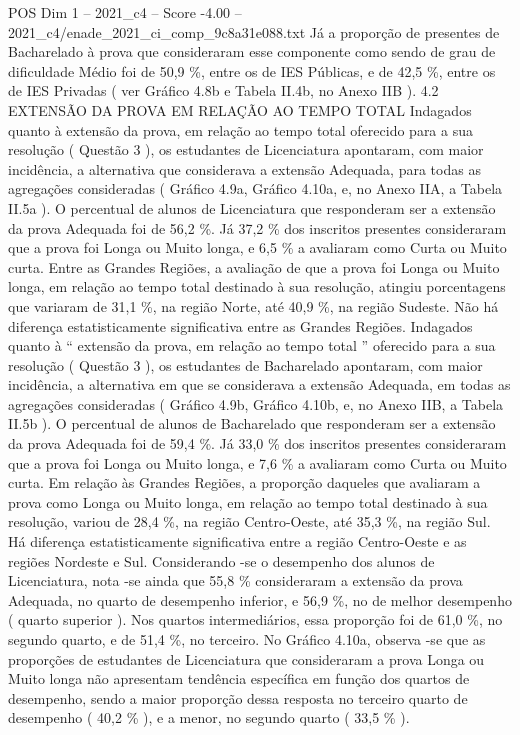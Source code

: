 \begin{textsample}{POS Dim 1 – 2021\_c4 – Score -4.00 – 2021\_c4/enade\_2021\_ci\_comp\_9c8a31e088.txt}
Já a proporção de presentes de Bacharelado à prova que consideraram esse componente como sendo de grau de dificuldade Médio foi de 50,9 \%, entre os de IES Públicas, e de 42,5 \%, entre os de IES Privadas ( ver Gráfico 4.8b e Tabela II.4b, no Anexo IIB ). 4.2 EXTENSÃO DA PROVA EM RELAÇÃO AO TEMPO TOTAL Indagados quanto à extensão da prova, em relação ao tempo total oferecido para a sua resolução ( Questão 3 ), os estudantes de Licenciatura apontaram, com maior incidência, a alternativa que considerava a extensão Adequada, para todas as agregações consideradas ( Gráfico 4.9a, Gráfico 4.10a, e, no Anexo IIA, a Tabela II.5a ).
O percentual de alunos de Licenciatura que responderam ser a extensão da prova Adequada foi de 56,2 \%.
Já 37,2 \% dos inscritos presentes consideraram que a prova foi Longa ou Muito longa, e 6,5 \% a avaliaram como Curta ou Muito curta.
Entre as Grandes Regiões, a avaliação de que a prova foi Longa ou Muito longa, em relação ao tempo total destinado à sua resolução, atingiu porcentagens que variaram de 31,1 \%, na região Norte, até 40,9 \%, na região Sudeste.
Não há diferença estatisticamente significativa entre as Grandes Regiões.
Indagados quanto à “ extensão da prova, em relação ao tempo total ” oferecido para a sua resolução ( Questão 3 ), os estudantes de Bacharelado apontaram, com maior incidência, a alternativa em que se considerava a extensão Adequada, em todas as agregações consideradas ( Gráfico 4.9b, Gráfico 4.10b, e, no Anexo IIB, a Tabela II.5b ).
O percentual de alunos de Bacharelado que responderam ser a extensão da prova Adequada foi de 59,4 \%.
Já 33,0 \% dos inscritos presentes consideraram que a prova foi Longa ou Muito longa, e 7,6 \% a avaliaram como Curta ou Muito curta.
Em relação às Grandes Regiões, a proporção daqueles que avaliaram a prova como Longa ou Muito longa, em relação ao tempo total destinado à sua resolução, variou de 28,4 \%, na região Centro-Oeste, até 35,3 \%, na região Sul.
Há diferença estatisticamente significativa entre a região Centro-Oeste e as regiões Nordeste e Sul.
Considerando -se o desempenho dos alunos de Licenciatura, nota -se ainda que 55,8 \% consideraram a extensão da prova Adequada, no quarto de desempenho inferior, e 56,9 \%, no de melhor desempenho ( quarto superior ).
Nos quartos intermediários, essa proporção foi de 61,0 \%, no segundo quarto, e de 51,4 \%, no terceiro.
No Gráfico 4.10a, observa -se que as proporções de estudantes de Licenciatura que consideraram a prova Longa ou Muito longa não apresentam tendência específica em função dos quartos de desempenho, sendo a maior proporção dessa resposta no terceiro quarto de desempenho ( 40,2 \% ), e a menor, no segundo quarto ( 33,5 \% ).

\end{textsample}
